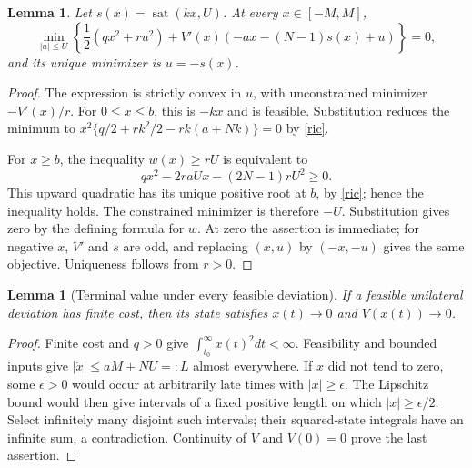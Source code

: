 \documentclass[11pt]{article}
\newtheorem{lemma}[theorem]{Lemma}
\theoremstyle{remark}
\newcommand{\sat}{\operatorname{sat}}
\begin{document}
\begin{lemma}\label{hjb}
Let $s(x)=\sat(kx,U)$. At every $x\in[-M,M]$,
\[
 \min_{|u|\leq U}\left\{
 \frac12(qx^2+ru^2)+V'(x)(-ax-(N-1)s(x)+u)
 \right\}=0,
\]
and its unique minimizer is $u=-s(x)$.
\end{lemma}
\begin{proof}
The expression is strictly convex in $u$, with unconstrained minimizer $-V'(x)/r$. For $0\leq x\leq b$, this is $-kx$ and is feasible. Substitution reduces the minimum to
$x^2\{q/2+rk^2/2-rk(a+Nk)\}=0$ by \eqref{ric}.

For $x\geq b$, the inequality $w(x)\geq rU$ is equivalent to
\[
 qx^2-2raUx-(2N-1)rU^2\geq0.
\]
This upward quadratic has its unique positive root at $b$, by \eqref{ric}; hence the inequality holds. The constrained minimizer is therefore $-U$. Substitution gives zero by the defining formula for $w$. At zero the assertion is immediate; for negative $x$, $V'$ and $s$ are odd, and replacing $(x,u)$ by $(-x,-u)$ gives the same objective. Uniqueness follows from $r>0$.
\end{proof}

\begin{lemma}[Terminal value under every feasible deviation]\label{terminal}
If a feasible unilateral deviation has finite cost, then its state satisfies $x(t)\to0$ and $V(x(t))\to0$.
\end{lemma}
\begin{proof}
Finite cost and $q>0$ give $\int_{t_0}^{\infty}x(t)^2dt<\infty$. Feasibility and bounded inputs give $|\dot x|\leq aM+NU=:L$ almost everywhere. If $x$ did not tend to zero, some $\epsilon>0$ would occur at arbitrarily late times with $|x|\geq\epsilon$. The Lipschitz bound would then give intervals of a fixed positive length on which $|x|\geq\epsilon/2$. Select infinitely many disjoint such intervals; their squared-state integrals have an infinite sum, a contradiction. Continuity of $V$ and $V(0)=0$ prove the last assertion.
\end{proof}
\end{document}
